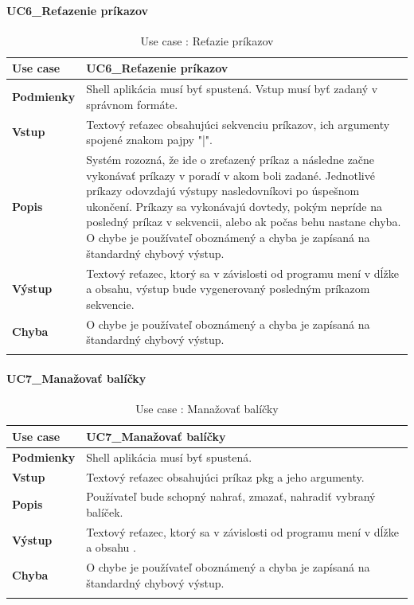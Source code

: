 \paragraph{UC6\_Reťazenie príkazov}
\begin{center}
	\begin{longtable}{|p{2.5cm}|p{12.2cm}|}

			\hline
			\textbf{Use case} & UC6\_Reťazenie príkazov \\ 
			\hline
			\textbf{Podmienky} & Shell aplikácia musí byť spustená. Vstup musí byť zadaný v správnom formáte.\\ 
			\hline
			\textbf{Vstup} & Textový reťazec obsahujúci sekvenciu príkazov, ich argumenty spojené znakom pajpy "|".\\
			\hline
			\textbf{Popis} & Systém rozozná, že ide o zreťazený príkaz a následne začne vykonávať príkazy v poradí v akom boli zadané. Jednotlivé príkazy odovzdajú  výstupy nasledovníkovi po úspešnom ukončení. Príkazy sa vykonávajú dovtedy, pokým nepríde na posledný príkaz v sekvencii, alebo ak počas behu nastane chyba. O chybe je používateľ oboznámený a chyba je zapísaná na štandardný chybový výstup. \\ 
			\hline

			\textbf{Výstup} & Textový reťazec, ktorý sa v závislosti od programu mení v dĺžke a obsahu, výstup bude vygenerovaný posledným príkazom sekvencie.\\
			\hline

			\textbf{Chyba} & O chybe je používateľ oboznámený a chyba je zapísaná na štandardný chybový výstup.\\
			\hline
	\caption{Use case : Reťazie príkazov}
	\label{table:1}

	\end{longtable}
\end{center}


\paragraph{UC7\_Manažovať balíčky}
\begin{center}
	\begin{longtable}{|p{2.5cm}|p{12.2cm}|}

			\hline
			\textbf{Use case} & UC7\_Manažovať balíčky \\ 
			\hline
			\textbf{Podmienky} & Shell aplikácia musí byť spustená.\\ 
			\hline
			\textbf{Vstup} & Textový reťazec obsahujúci príkaz pkg a jeho argumenty.\\
			\hline
			\textbf{Popis} & Používateľ bude schopný nahrať, zmazať, nahradiť vybraný balíček. \\ 
			\hline
			\textbf{Výstup} & Textový reťazec, ktorý sa v závislosti od programu mení v dĺžke a obsahu .\\
			\hline
			\textbf{Chyba} & O chybe je používateľ oboznámený a chyba je zapísaná na štandardný chybový výstup.\\
			\hline
	\caption{Use case : Manažovať balíčky}
	\label{table:1}

	\end{longtable}
\end{center}
